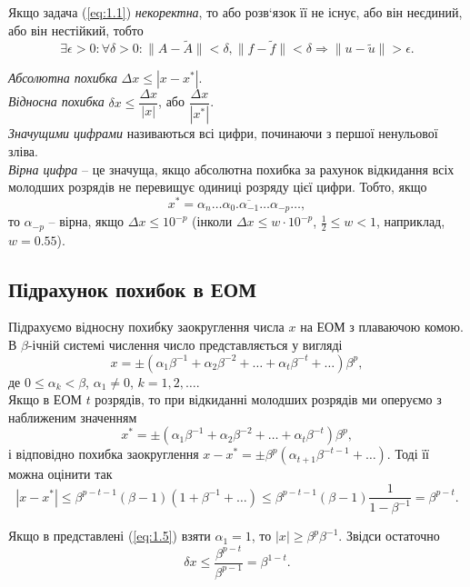 Якщо задача (\ref{eq:1.1}) \textit{некоректна}, то або розв‘язок її не існує, або він неєдиний, або він нестійкий, тобто \[ \exists \epsilon > 0: \forall \delta > 0: \| A - \tilde A\|<\delta, \|f-\tilde f\| < \delta \Rightarrow \|u-\tilde u\| > \epsilon.\]

\textit{Абсолютна похибка} $\Delta x \le |x - x^*|$. \\

\textit{Відносна похибка} $\delta x \le \dfrac{\Delta x}{|x|}$, або $\dfrac{\Delta x}{|x^*|}$. \\

\textit{Значущими цифрами} називаються всі цифри, починаючи з першої ненульової зліва. \\

\textit{Вірна цифра} -- це значуща, якщо абсолютна похибка за рахунок відкидання всіх молодших розрядів не перевищує одиниці розряду цієї цифри. Тобто, якщо \[x^* = \overline{\alpha_n \ldots \alpha_0.\alpha_{-1}\ldots\alpha_{-p}\ldots},\] то $\alpha_{-p}$ -- вірна, якщо $\Delta x \le 10^{-p}$ (інколи $\Delta x \le w \cdot 10^{-p}$, $\frac12 \le w < 1$, наприклад, $w = 0.55$).

\subsection{Підрахунок похибок в ЕОМ}

Підрахуємо відносну похибку заокруглення числа $x$ на ЕОМ з плаваючою комою. В $\beta$-ічній системі числення число представляється у вигляді
\begin{equation}
	\label{eq:1.5}
	x = \pm (\alpha_1 \beta^{-1} + \alpha_2 \beta^{-2} + \ldots + \alpha_t \beta^{-t} + \ldots) \beta^p,
\end{equation}
де $0 \le \alpha_k < \beta$, $\alpha_1 \ne 0$, $k = 1,2,\ldots$. \\

Якщо в ЕОМ $t$ розрядів, то при відкиданні молодших розрядів ми оперуємо з наближеним значенням \[x^* = \pm (\alpha_1 \beta^{-1} + \alpha_2 \beta^{-2} + \ldots + \alpha_t \beta^{-t}) \beta^p,\] 
і відповідно похибка заокруглення $x - x^* = \pm \beta^p (\alpha_{t+1} \beta^{-t-1} + \ldots)$. Тоді її можна оцінити так \[ |x - x^*| \le \beta^{p-t-1}(\beta-1)(1 + \beta^{-1}+\ldots)\le \beta^{p-t-1}(\beta-1)\dfrac{1}{1-\beta^{-1}}=\beta^{p-t}.\]

Якщо в представлені (\ref{eq:1.5}) взяти $\alpha_1 = 1$, то $|x| \ge \beta^p \beta^{-1}$. Звідси остаточно \[\delta x \le \dfrac{\beta^{p-t}}{\beta^{p-1}}=\beta^{1-t}.\]

